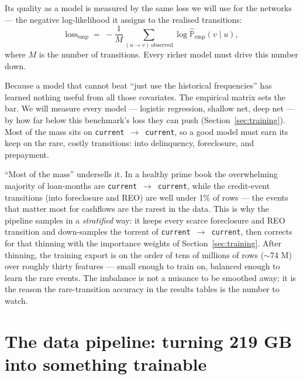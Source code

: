 \documentclass[11pt]{article}
\newcommand{\Prob}{\mathbb{P}}
\begin{document}
Its quality as a model is measured by the same loss we will use for the networks --- the
negative log-likelihood it assigns to the realised transitions:
\begin{equation}
  \text{loss}_{\text{emp}}
  \;=\; -\frac{1}{M}\sum_{(u\to v)\ \text{observed}}
        \log \widehat{\Prob}_{\text{emp}}(v \mid u),
  \label{eq:emploss}
\end{equation}
where $M$ is the number of transitions. Every richer model must drive this number down.

\begin{intuition}
Because a model that cannot beat ``just use the historical frequencies'' has learned
nothing useful from all those covariates. The empirical matrix sets the bar. We will
measure every model --- logistic regression, shallow net, deep net --- by how far below
this benchmark's loss they can push (Section~\ref{sec:training}). Most of the
mass sits on \texttt{current}~$\to$~\texttt{current}, so a good model must earn its keep
on the rare, costly transitions: into delinquency, foreclosure, and prepayment.
\end{intuition}

\begin{intuition}
``Most of the mass'' undersells it. In a healthy prime book the overwhelming majority of
loan-months are \texttt{current}~$\to$~\texttt{current}, while the credit-event transitions
(into foreclosure and REO) are well under 1\% of rows --- the events that matter most for
cashflows are the rarest in the data. This is why the pipeline samples in a
\emph{stratified} way: it keeps every scarce foreclosure and REO transition and down-samples
the torrent of \texttt{current}~$\to$~\texttt{current}, then corrects for that thinning with
the importance weights of Section~\ref{sec:training}. After thinning, the training export is
on the order of tens of millions of rows ($\sim$74 M) over roughly thirty features --- small
enough to train on, balanced enough to learn the rare events. The imbalance is not a nuisance
to be smoothed away; it is the reason the rare-transition accuracy in the results tables is
the number to watch.
\end{intuition}

\section{The data pipeline: turning 219 GB into something trainable}
\label{sec:pipeline}
\end{document}
